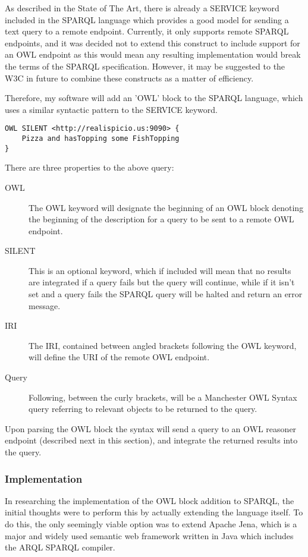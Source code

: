 \documentclass{article}
\begin{document}
As described in the State of The Art, there is already a SERVICE keyword
included in the SPARQL language which provides a good model for sending a text
query to a remote endpoint. Currently, it only supports remote SPARQL endpoints,
and it was decided not to extend this construct to include support for an OWL
endpoint as this would mean any resulting implementation would break the terms
of the SPARQL specification. However, it may be suggested to the W3C in future
to combine these constructs as a matter of efficiency. 

Therefore, my software will add an 'OWL' block to the SPARQL language, which
uses a similar syntactic pattern to the SERVICE keyword.

\begin{lstlisting}
OWL SILENT <http://realispicio.us:9090> {
    Pizza and hasTopping some FishTopping
}
\end{lstlisting}

There are three properties to the above query:

\begin{description}
    \item[OWL] The OWL keyword will designate the beginning of an OWL block
    denoting the beginning of the description for a query to be sent to a remote
    OWL endpoint.
    \item[SILENT] This is an optional keyword, which if included will mean that
    no results are integrated if a query fails but the query will continue,
    while if it isn't set and a query fails the SPARQL query will be halted and
    return an error message.
    \item[IRI] The IRI, contained between angled brackets following the OWL
    keyword, will define the URI of the remote OWL endpoint.
    \item[Query] Following, between the curly brackets, will be a Manchester OWL
    Syntax query referring to relevant objects to be returned to the query.
\end{description}

Upon parsing the OWL block the syntax will send a query to an OWL reasoner
endpoint (described next in this section), and integrate the returned results
into the query. 

\subsubsection{Implementation}

In researching the implementation of the OWL block addition to SPARQL, the
initial thoughts were to perform this by actually extending the language itself.
To do this, the only seemingly viable option was to extend Apache Jena, which is
a major and widely used semantic web framework written in Java which includes the 
ARQL SPARQL compiler. 
\end{document}
